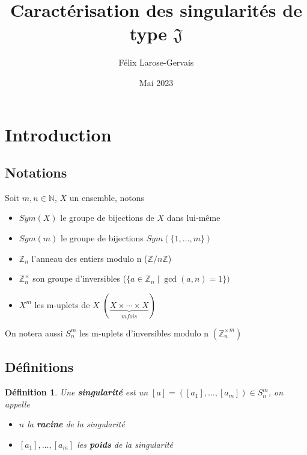 \documentclass{article}
\title{Caractérisation des singularités de type $\mathfrak{J}$}
\author{Félix Larose-Gervais}
\date{Mai 2023}
\newtheorem{definition}{Définition}
\begin{document}
\maketitle

\newpage

\tableofcontents

\newpage

\section{Introduction}

\subsection{Notations}

Soit $m, n \in \mathbb{N}$, $X$ un ensemble, notons 

\begin{itemize}
    \item $Sym(X)$ le groupe de bijections de $X$ dans lui-même
    \item $Sym(m)$ le groupe de bijections $Sym(\{1, \dots, m \})$ 
    \item $\mathbb{Z}_n$ l'anneau des entiers modulo n ($\mathbb{Z}/n\mathbb{Z}$)
    \item $\mathbb{Z}_n^\times$ son groupe d'inversibles ($\{ a \in \mathbb{Z}_n \mid \gcd(a, n) = 1 \})$
    \item $X^m$ les m-uplets de $X$ $(\underbrace{X \times \cdots \times X}_{m fois})$
\end{itemize}

On notera aussi $S_n^m$ les m-uplets d'inversibles modulo n $({\mathbb{Z}_n^\times}^m)$

\subsection{Définitions}

\begin{definition}
    Une \textbf{singularité} est un $[a] = ([a_1], \dots, [a_m]) \in S_n^m$, on appelle \begin{itemize}
        \item $n$ la \textbf{racine} de la singularité
        \item $[a_1], \dots, [a_m]$ les \textbf{poids} de la singularité
    \end{itemize}
\end{definition}
\end{document}
